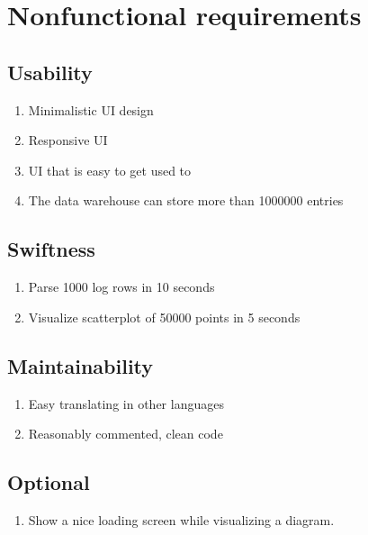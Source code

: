 \section{Nonfunctional requirements}

\renewcommand{\theenumi}{/N\arabic{enumi}0/}
\renewcommand{\labelenumi}{\theenumi}


\subsection{Usability}

\begin{enumerate}
  \item Minimalistic UI design
  \item Responsive UI
  \item UI that is easy to get used to
  
  \item The data warehouse can store more than 1000000 entries
\end{enumerate}

\subsection{Swiftness}

\begin{enumerate}[resume] %
	\item Parse 1000 log rows in 10 seconds
	
	\item Visualize scatterplot of 50000 points in 5 seconds
\end{enumerate}

\subsection{Maintainability}

\begin{enumerate}[resume]
  \item Easy translating in other languages
  \item Reasonably commented, clean code
\end{enumerate}


\subsection{Optional}

\begin{enumerate}[resume]
  \item Show a nice loading screen while visualizing a diagram. 
\end{enumerate}